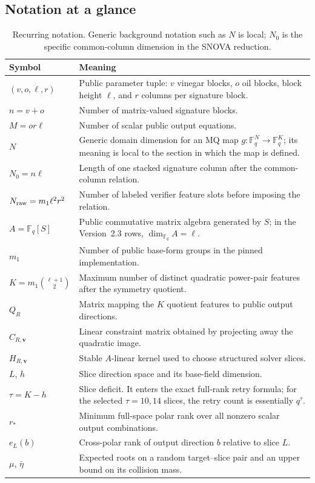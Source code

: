 \documentclass[11pt]{article}
\newcommand{\F}{\mathbb F}
\newcommand{\SNOVA}{\textsf{SNOVA}}
\begin{document}
\subsection{Notation at a glance}\label{sec:notation}

\begin{table}[H]
\centering
\caption{Recurring notation.  Generic background notation such as $N$ is local;
$N_0$ is the specific common-column dimension in the \SNOVA{} reduction.}
\label{tab:notation}
\small
\renewcommand{\arraystretch}{1.12}
\begin{tabularx}{0.96\textwidth}{@{}>{\raggedright\arraybackslash}p{}X@{}}
\toprule
Symbol & Meaning\\
\midrule
$(v,o,\ell,r)$ & Public parameter tuple: $v$ vinegar blocks, $o$ oil blocks,
block height $\ell$, and $r$ columns per signature block.\\
$n=v+o$ & Number of matrix-valued signature blocks.\\
$M=or\ell$ & Number of scalar public output equations.\\
$N$ & Generic domain dimension for an MQ map $g:\F_q^N\to\F_q^K$; its
meaning is local to the section in which the map is defined.\\
$N_0=n\ell$ & Length of one stacked signature column after the common-column
relation.\\
$N_{\rm raw}=m_1\ell^2r^2$ & Number of labeled verifier feature slots before imposing
the relation.\\
$A=\F_q[S]$ & Public commutative matrix algebra generated by $S$; in the
Version~2.3 rows, $\dim_{\F_q}A=\ell$.\\
$m_1$ & Number of public base-form groups in the pinned implementation.\\
$K=m_1\binom{\ell+1}{2}$ & Maximum number of distinct quadratic power-pair
features after the symmetry quotient.\\
$Q_R$ & Matrix mapping the $K$ quotient features to public output directions.\\
$C_{R,\mathbf v}$ & Linear constraint matrix obtained by projecting away the quadratic
image.\\
$H_{R,\mathbf v}$ & Stable $A$-linear kernel used to choose structured solver slices.\\
$L$, $h$ & Slice direction space and its base-field dimension.\\
$\tau=K-h$ & Slice deficit.  It enters the exact full-rank retry formula;
for the selected $\tau=10,14$ slices, the retry count is essentially $q^\tau$.\\
$r_*$ & Minimum full-space polar rank over all nonzero scalar output
combinations.\\
$e_L(b)$ & Cross-polar rank of output direction $b$ relative to slice $L$.\\
$\mu$, $\bar\eta$ & Expected roots on a random target--slice pair and an upper
bound on its collision mass.\\
\bottomrule
\end{tabularx}
\end{table}
\end{document}
